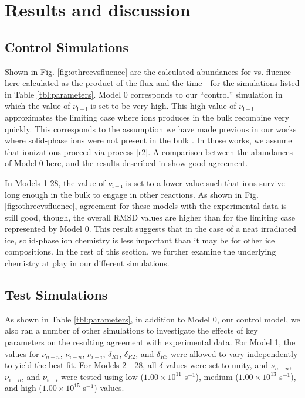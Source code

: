 \documentclass[journal=aesccq,manuscript=draft]{achemso}
\begin{document}
\section{Results and discussion} \label{sec:results}

\subsection{Control Simulations}

Shown in Fig. \ref{fig:othreevsfluence} are the calculated abundances for  vs. fluence - here calculated as the product of the flux and the time - for the simulations listed in Table \ref{tbl:parameters}. Model 0 corresponds to our ``control'' simulation in which the value of $\nu_\mathrm{i-i}$ is set to be very high. This high value of $\nu_\mathrm{i-i}$ approximates the limiting case where ions produces in the bulk recombine very quickly. This corresponds to the assumption we have made previous in our works where solid-phase ions were not present in the bulk \citep{shingledecker_general_2018,shingledecker_efficient_2020,mullikin_new_2021}. In those works, we assume that ionizations proceed via process \eqref{r2}. A comparison between the abundances of Model 0 here, and the results described in \citet{mullikin_new_2021} show good agreement.

In Models 1-28, the value of $\nu_\mathrm{i-i}$ is set to a lower value such that ions survive long enough in the bulk to engage in other reactions. As shown in Fig. \ref{fig:othreevsfluence}, agreement for these models with the experimental data is still good, though, the overall RMSD values are higher than for the limiting case represented by Model 0. This result suggests that in the case of a neat irradiated  ice, solid-phase ion chemistry is less important than it may be for other ice compositions. In the rest of this section, we further examine the underlying chemistry at play in our different simulations.

\subsection{Test Simulations}

As shown in Table \ref{tbl:parameters}, in addition to Model 0, our control model, we also ran a number of other simulations to investigate the effects of key parameters on the resulting agreement with experimental data. For Model 1, the values for $\nu_{n-n}$, $\nu_{i-n}$, $\nu_{i-i}$, $\delta_{R1}$, $\delta_{R2}$, and $\delta_{R3}$ were allowed to vary independently to yield the best fit. For Models 2 - 28, all $\delta$ values were set to unity, and $\nu_{n-n}$, $\nu_{i-n}$, and $\nu_{i-i}$ were tested using low ($1.00\times 10^{11}$ s$^{-1}$), medium ($1.00\times 10^{13}$ s$^{-1}$), and high ($1.00\times 10^{15}$ s$^{-1}$) values.
\end{document}
